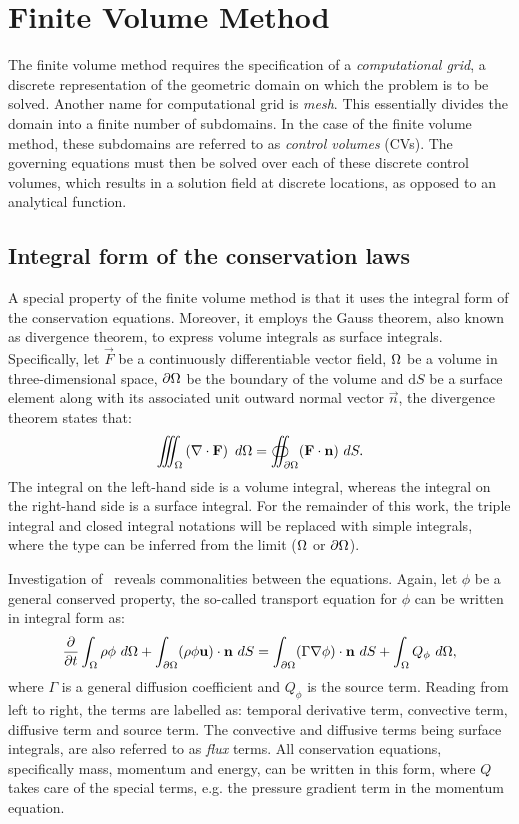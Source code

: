 \section{Finite Volume Method}
\label{sec:fv}
%
%
The finite volume method requires the specification of a \textit{computational grid}, a discrete representation of the geometric domain on which the problem is to be solved. Another name for computational grid is \textit{mesh}. This essentially divides the domain into a finite number of subdomains. In the case of the finite volume method, these subdomains are referred to as \textit{control volumes} (CVs). The governing equations must then be solved over each of these discrete control volumes, which results in a solution field at discrete locations, as opposed to an analytical function.

\subsection{Integral form of the conservation laws}
A special property of the finite volume method is that it uses the integral form of the conservation equations. Moreover, it employs the Gauss theorem, also known as divergence theorem, to express volume integrals as surface integrals. Specifically, let $\vec{F}$ be a continuously differentiable vector field, $\Omega$ be a volume in three-dimensional space, $\partial \Omega$ be the boundary of the volume and $\text{d}S$ be a surface element along with its associated unit outward normal vector $\vec{n}$, the divergence theorem states that:
\begin{equation*}
    \iiint_{\Omega} \left( \nabla \cdot \mathbf{F} \right)~d\Omega =
        \oiint_{\partial \Omega} (\mathbf{F}\cdot\mathbf{n})~dS.
\end{equation*}
The integral on the left-hand side is a volume integral, whereas the integral on the right-hand side is a surface integral. For the remainder of this work, the triple integral and closed integral notations will be replaced with simple integrals, where the type can be inferred from the limit ($\Omega$ or $\partial \Omega$).

Investigation of~ reveals commonalities between the equations. Again, let $\phi$ be a general conserved property, the so-called transport equation for $\phi$ can be written in integral form as:
\begin{equation}
     \frac{\partial }{\partial t} \int_\Omega \rho \phi~d\Omega
        + \int_{\partial \Omega} (\rho \phi \mathbf{u})\cdot\mathbf{n}~dS
        = \int_{\partial \Omega} (\Gamma \nabla \phi)\cdot\mathbf{n}~dS
        + \int_\Omega Q_\phi~d\Omega
    \label{eq:fvtransport},
\end{equation}
where $\Gamma$ is a general diffusion coefficient and $Q_\phi$ is the source term. Reading from left to right, the terms are labelled as: temporal derivative term, convective term, diffusive term and source term. The convective and diffusive terms being surface integrals, are also referred to as \textit{flux} terms. All conservation equations, specifically mass, momentum and energy, can be written in this form, where $Q$ takes care of the special terms, e.g. the pressure gradient term in the momentum equation.

